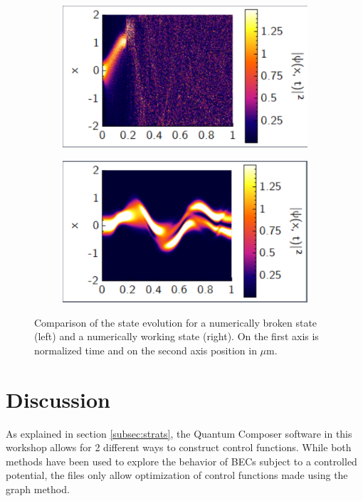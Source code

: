 \documentclass[aps,pra,reprint,superscriptaddress]{revtex4-1}
\begin{document}
\begin{figure}
	\begin{subfigure}{0.45\columnwidth}
		\includegraphics[width=\columnwidth]{graphics/newclustering/QM2Clusteringk4A04T06178-2.PNG}
	\end{subfigure}
	\begin{subfigure}{0.45\columnwidth}
		\includegraphics[width=\columnwidth]{graphics/newclustering/QM2Clusteringk5A015T07475-2.PNG}
	\end{subfigure}	
	\caption{Comparison of the state evolution for a numerically broken state (left) and a numerically working state (right). On the first axis is normalized time and on the second axis position in $\mu$m.}
	\label{fig:statePlots}
\end{figure}

\section{\label{sec:disc}Discussion}
As explained in section \ref{subsec:strats}, the Quantum Composer software in this workshop allows for 2 different ways to construct control functions. While both methods have been used to explore the behavior of BECs subject to a controlled potential, the files only allow optimization of control functions made using the graph method. 
\end{document}
